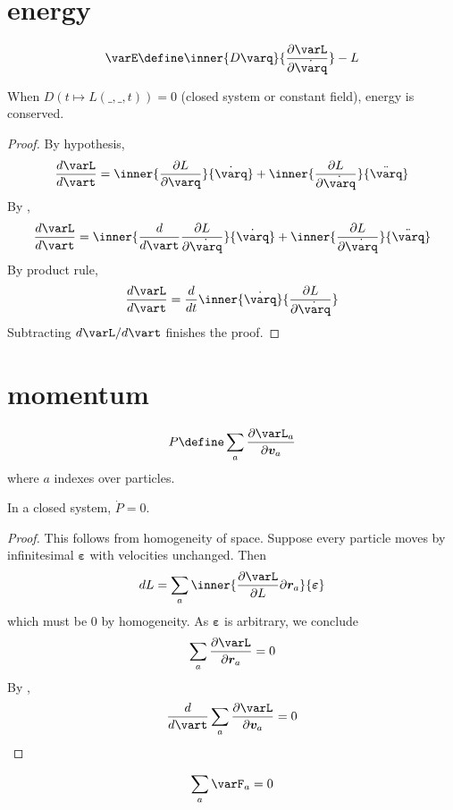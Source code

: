 \documentclass{scrbook}
\numberwithin{thms}{chapter}
\newcommand{\der}{\dot}
\newcommand{\dder}{\ddot}
\renewcommand{\vec}[1]{\bm{#1}}
\newcommand{\Der}{D}
\begin{document}
\section{energy}
\begin{defn}[energy]
  \label{def:energy}
  \[
    \varE\define  \inner{\Der \varq}{\frac{\partial\varL}{\partial \derq}} - L
  \]
\end{defn}
\begin{theorem}
  When $\Der(t\mapsto L(\_,\_,t)) =0$ (\eg closed system or constant field), energy is conserved. 
\end{theorem}
\begin{proof}
  By hypothesis, 
  \[
    \frac{d\varL}{d\vart} = \inner{\frac{\partial L}{\partial \varq}}{\der \varq} + \inner{\frac{\partial L}{\partial \derq}}{\dder \varq}
  \]
  By ,
  \[
    \frac{d\varL}{d\vart} = \inner{\frac{d}{d\vart}\frac{\partial L}{\partial \der\varq}}{\der \varq} + \inner{\frac{\partial L}{\partial \derq}}{\dder \varq}
  \]
  By product rule, 
  \[
    \frac{d\varL}{d\vart} = \frac{d}{dt}\inner{\derq}{\frac{\partial L}{\partial \der \varq}}
  \]
  Subtracting $d\varL/d\vart$ finishes the proof. 
\end{proof}
\section{momentum}
\begin{defn}[momentum]\label{def:momentum}
  \renewcommand{\varv}{\vec v}
  \renewcommand{\varr}{\vec r}
  \[
    P\define \sum_a \frac{\partial \varL_a}{\partial\varv_a}
  \]
  where $a$ indexes over particles. 
\end{defn}
\begin{theorem}
  In a closed system, $\der P=0$. 
\end{theorem}
\begin{proof}
  \newcommand{\nudge}{\vec\varepsilon}
  \newcommand{\dL}{dL}
  \renewcommand{\varr}{\vec r}
  This follows from homogeneity of space. Suppose every particle moves by infinitesimal $\nudge$ with velocities unchanged. Then 
  \[
    \dL = \sum_a \inner{\frac{\partial \varL}{\partial L}{\partial \varr_a}}{\nudge}
  \]
  which must be $0$ by homogeneity. As $\nudge$ is arbitrary, we conclude 
  \[
    \sum_a \frac{\partial \varL}{\partial \varr_a}=0
  \]
  By ,
  \[
    \frac{d}{d\vart}\sum_a \frac{\partial \varL}{\partial \varv_a} = 0
  \]
\end{proof}
\begin{cor}
  \[
    \sum_a \vec \varF_a =0 
  \]
\end{cor}
\end{document}

